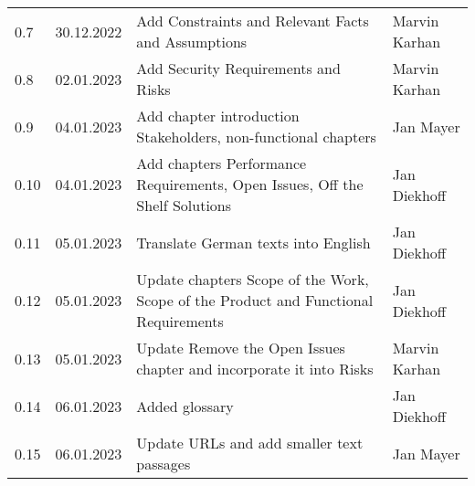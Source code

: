 \begin{footnotesize}
\begin{longtable}[L L L L]{ p{} p{} p{} p{} }
    0.7              & 30.12.2022    & Add Constraints and Relevant Facts and Assumptions                                                                                            & Marvin Karhan   \\

    \rowcolor{Gray}
    0.8              & 02.01.2023    & Add Security Requirements and Risks                                                                                                           & Marvin Karhan   \\

    0.9              & 04.01.2023    & Add chapter introduction Stakeholders, non-functional chapters                                                                                & Jan Mayer       \\

    \rowcolor{Gray}
    0.10             & 04.01.2023    & Add chapters Performance Requirements, Open Issues, Off the Shelf Solutions                                                                   & Jan Diekhoff    \\

    0.11             & 05.01.2023    & Translate German texts into English                                                                                                           & Jan Diekhoff    \\

    \rowcolor{Gray}
    0.12             & 05.01.2023    & Update chapters Scope of the Work, Scope of the Product and Functional Requirements                                                           & Jan Diekhoff    \\

    0.13             & 05.01.2023    & Update Remove the Open Issues chapter and incorporate it into Risks                                                                           & Marvin Karhan   \\

    \rowcolor{Gray}
    0.14             & 06.01.2023    & Added glossary                                                                                                                                & Jan Diekhoff    \\

    0.15             & 06.01.2023    & Update URLs and add smaller text passages                                                                                                     & Jan Mayer       \\
    

\end{longtable}
\end{footnotesize}
